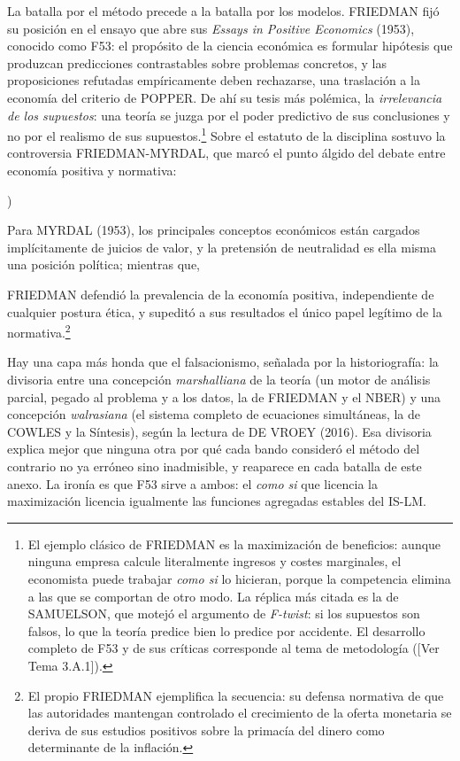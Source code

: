 \documentclass[10pt,a4paper]{article}
\newcounter{alphaitem}
\newenvironment{la}
      {\begin{list}{\alph{alphaitem})}{%
          \usecounter{alphaitem}%
          \setlength{\leftmargin}{1cm}%
          \setlength{\parskip}{3pt}%
          \setlength{\itemsep}{0pt}%
          \setlength{\parsep}{0pt}%
      }}
      {\end{list}}
\newcommand{\authorfont}[1]{{\fontfamily{EBGaramond-TLF}\selectfont #1}}
\newcounter{anexo}
\begin{document}
La batalla por el método precede a la batalla por los modelos. FRIEDMAN fijó su posición en el ensayo que abre sus \textit{Essays in Positive Economics} (1953), conocido como F53: el propósito de la ciencia económica es formular hipótesis que produzcan predicciones contrastables sobre problemas concretos, y las proposiciones refutadas empíricamente deben rechazarse, una traslación a la economía del criterio de POPPER. De ahí su tesis más polémica, la \textit{irrelevancia de los supuestos}: una teoría se juzga por el poder predictivo de sus conclusiones y no por el realismo de sus supuestos.\footnote{%
    El ejemplo clásico de FRIEDMAN es la maximización de beneficios: aunque ninguna empresa calcule literalmente ingresos y costes marginales, el economista puede trabajar \textit{como si} lo hicieran, porque la competencia elimina a las que se comportan de otro modo. La réplica más citada es la de SAMUELSON, que motejó el argumento de \textit{F-twist}: si los supuestos son falsos, lo que la teoría predice bien lo predice por accidente. El desarrollo completo de F53 y de sus críticas corresponde al tema de metodología ([\authorfont{Ver Tema 3.A.1}]).
} Sobre el estatuto de la disciplina sostuvo la controversia FRIEDMAN-MYRDAL, que marcó el punto álgido del debate entre economía positiva y normativa:
\begin{la}
    \item Para MYRDAL (1953), los principales conceptos económicos están cargados implícitamente de juicios de valor, y la pretensión de neutralidad es ella misma una posición política; mientras que,
    \item FRIEDMAN defendió la prevalencia de la economía positiva, independiente de cualquier postura ética, y supeditó a sus resultados el único papel legítimo de la normativa.\footnote{%
        El propio FRIEDMAN ejemplifica la secuencia: su defensa normativa de que las autoridades mantengan controlado el crecimiento de la oferta monetaria se deriva de sus estudios positivos sobre la primacía del dinero como determinante de la inflación.
    }
\end{la}

Hay una capa más honda que el falsacionismo, señalada por la historiografía: la divisoria entre una concepción \textit{marshalliana} de la teoría (un motor de análisis parcial, pegado al problema y a los datos, la de FRIEDMAN y el NBER) y una concepción \textit{walrasiana} (el sistema completo de ecuaciones simultáneas, la de COWLES y la Síntesis), según la lectura de DE VROEY (2016). Esa divisoria explica mejor que ninguna otra por qué cada bando consideró el método del contrario no ya erróneo sino inadmisible, y reaparece en cada batalla de este anexo. La ironía es que F53 sirve a ambos: el \textit{como si} que licencia la maximización licencia igualmente las funciones agregadas estables del IS-LM.
\end{document}
